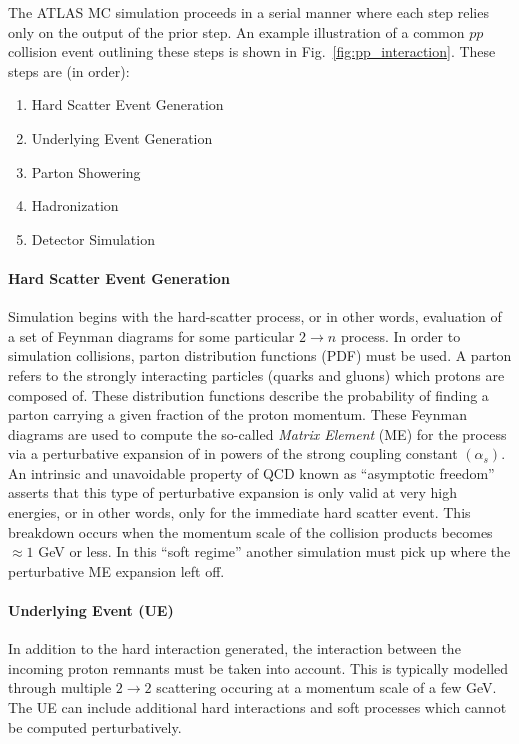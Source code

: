 The ATLAS MC simulation proceeds in a serial manner where each step relies only on the output of the prior step.
An example illustration of a common $pp$ collision event outlining these steps is shown in Fig.~\ref{fig:pp_interaction}.
These steps are (in order): %
\begin{enumerate}
    \itemsep0em 
    \item Hard Scatter Event Generation
    \item Underlying Event Generation
    \item Parton Showering
    \item Hadronization
    \item Detector Simulation
\end{enumerate}

\paragraph{\textbf{Hard Scatter Event Generation}}
Simulation begins with the hard-scatter process, or in other words, evaluation of a set of Feynman diagrams for some particular $2 \rightarrow n$ process.
In order to simulation collisions, parton distribution functions (PDF) must be used.
A parton refers to the strongly interacting particles (quarks and gluons) which protons are composed of.
These distribution functions describe the probability of finding a parton carrying a given fraction of the proton momentum.
These Feynman diagrams are used to compute the so-called \textit{Matrix Element} (ME) for the process via a perturbative expansion of in powers of the strong coupling constant $(\alpha_s)$.
An intrinsic and unavoidable property of QCD known as ``asymptotic freedom'' asserts that this type of perturbative expansion is only valid at very high energies, or in other words, only for the immediate hard scatter event.
This breakdown occurs when the momentum scale of the collision products becomes $\approx 1$ GeV or less.
In this ``soft regime'' another simulation must pick up where the perturbative ME expansion left off.

\paragraph{\textbf{Underlying Event (UE)}}
In addition to the hard interaction generated, the interaction between the incoming proton remnants must be taken into account.
This is typically modelled through multiple $2 \rightarrow 2$ scattering occuring at a momentum scale of a few GeV.
The UE can include additional hard interactions and soft processes which cannot be computed perturbatively.

